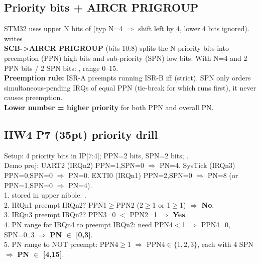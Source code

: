 \subsection{Priority bits + AIRCR PRIGROUP}
STM32 uses upper N bits of  (typ N=4 $\Rightarrow$ shift left by 4, lower 4 bits ignored).  writes \\
\textbf{SCB->AIRCR PRIGROUP} (bits 10:8) splits the N priority bits into preemption (PPN) high bits and sub-priority (SPN) low bits. With N=4 and 2 PPN bits / 2 SPN bits: , range 0--15.\\
\textbf{Preemption rule:} ISR-A preempts running ISR-B iff  (strict). SPN only orders simultaneous-pending IRQs of equal PPN (tie-break for which runs first), it never causes preemption.\\
\textbf{Lower number = higher priority} for both PPN and overall PN.

\subsection{HW4 P7 (35pt) priority drill}
Setup: 4 priority bits in IP[7:4]; PPN=2 bits, SPN=2 bits; .\\
Demo proj: UART2 (IRQn2) PPN=1,SPN=0 $\Rightarrow$ PN=4. SysTick (IRQn3) PPN=0,SPN=0 $\Rightarrow$ PN=0. EXTI0 (IRQn1) PPN=2,SPN=0 $\Rightarrow$ PN=8 (or PPN=1,SPN=0 $\Rightarrow$ PN=4).\\
1.  stored in upper nibble: .\\
2. IRQn1 preempt IRQn2? PPN1$\geq$PPN2 (2$\geq$1 or 1$\geq$1) $\Rightarrow$ \textbf{No}.\\
3. IRQn3 preempt IRQn2? PPN3=0 $<$ PPN2=1 $\Rightarrow$ \textbf{Yes}.\\
4. PN range for IRQn4 to preempt IRQn2: need PPN4$<$1 $\Rightarrow$ PPN4=0, SPN=0..3 $\Rightarrow$ \textbf{PN $\in$ [0,3]}.\\
5. PN range to NOT preempt: PPN4$\geq$1 $\Rightarrow$ PPN4$\in\{1,2,3\}$, each with 4 SPN $\Rightarrow$ \textbf{PN $\in$ [4,15]}.

